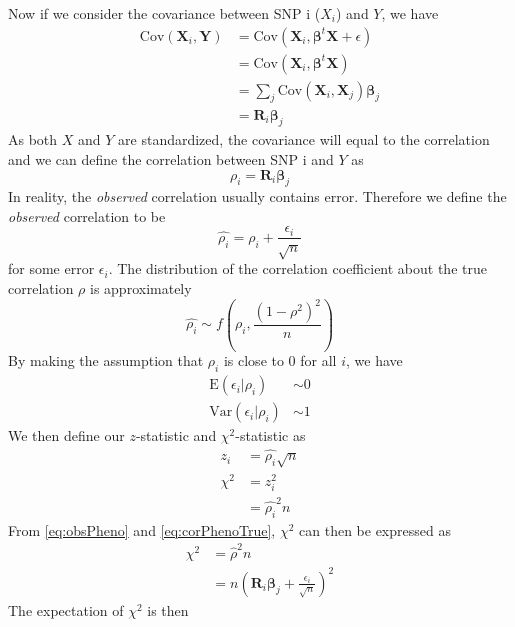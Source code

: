 \documentclass{book}
\begin{document}
			Now if we consider the covariance between \gls{SNP} i ($X_i$) and $Y$, we have
			\begin{align}
			 \mathrm{Cov}(\boldsymbol{X}_i,\boldsymbol{Y}) &= \mathrm{Cov}(\boldsymbol{X}_i,\boldsymbol{\beta}^t\boldsymbol{X}+\epsilon) \nonumber\\
			 &=\mathrm{Cov}(\boldsymbol{X}_i,\boldsymbol{\beta}^t\boldsymbol{X}) \nonumber\\
			 &=\sum_j{\mathrm{Cov}(\boldsymbol{X}_i,\boldsymbol{X}_j)\boldsymbol{\beta}_j} \nonumber\\
			 &=\boldsymbol{R}_i\boldsymbol{\beta}_j
			 \label{eq:covPhenoTrue}
			\end{align}
			As both $X$ and $Y$ are standardized, the covariance will equal to the correlation and we can define the correlation between \gls{SNP} i and $Y$ as
			\begin{equation}
				\rho_i = \boldsymbol{R}_i\boldsymbol{\beta}_j
				\label{eq:corPhenoTrue}
			\end{equation}
			In reality, the \emph{observed} correlation usually contains error. 
			Therefore we define the \emph{observed} correlation to be
			\begin{equation}
			\hat{\rho_i} = \rho_i+\frac{\epsilon_i}{\sqrt{n}}
			\label{eq:obsPheno}
			\end{equation}
			for some error $\epsilon_i$. 
			The distribution of the correlation coefficient about the true correlation $\rho$ is approximately
			$$
				\hat{\rho_i}\sim f(\rho_i, \frac{(1-\rho^2)^2}{n})
			$$
			By making the assumption that $\rho_i$ is close to 0 for all $i$, we have 
			\begin{align*}
				\mathrm{E}(\epsilon_i|\rho_i)&\sim 0\\
				\mathrm{Var}(\epsilon_i|\rho_i)&\sim 1
			\end{align*}
			We then define our $z$-statistic and $\chi^2$-statistic as
			\begin{align*}
				z_i &= \hat{\rho_i}\sqrt{n} \\
				\chi^2 &= z_i^2\\
				&=\hat{\rho_i}^2n
			\end{align*}
			From \cref{eq:obsPheno} and \cref{eq:corPhenoTrue}, $\chi^2$ can then be expressed as
			\begin{align*}
			\chi^2&=\hat{\rho}^2n\\
			&=n(\boldsymbol{R}_i\boldsymbol{\beta}_j+\frac{\epsilon_i}{\sqrt{n}})^2
			\end{align*}
			The expectation of $\chi^2$ is then
\end{document}
